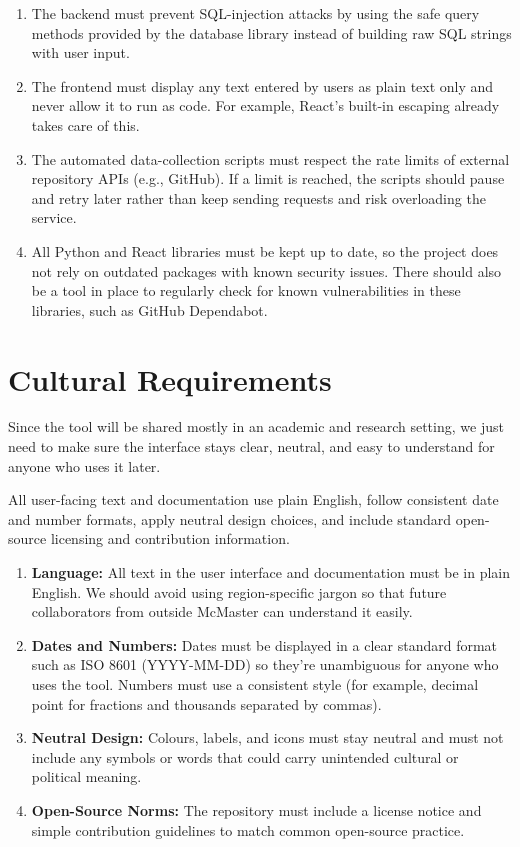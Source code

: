 \documentclass[12pt]{article}
\begin{document}
\begin{enumerate}[label=SR-IM\arabic*]
\item The backend must prevent SQL-injection attacks by using the safe query methods provided by the database library instead of building raw SQL strings with user input.
\item The frontend must display any text entered by users as plain text only and never allow it to run as code. For example, React’s built-in escaping already takes care of this.
\item The automated data-collection scripts must respect the rate limits of external repository APIs (e.g., GitHub). If a limit is reached, the scripts should pause and retry later rather than keep sending requests and risk overloading the service.
\item All Python and React libraries must be kept up to date, so the project does not rely on outdated packages with known security issues. There should also be a tool in place to regularly check for known vulnerabilities in these libraries, such as GitHub Dependabot.
\end{enumerate}

\section{Cultural Requirements}
Since the tool will be shared mostly in an academic and research setting, we just need to make sure the interface stays clear, neutral, and easy to understand for anyone who uses it later.

All user-facing text and documentation use plain English, follow consistent date and number formats, apply neutral design choices, and include standard open-source licensing and contribution information.
\begin{enumerate}[label=CU-CR\arabic*]
\item \textbf{Language:} All text in the user interface and documentation must be in plain English. We should avoid using region-specific jargon so that future collaborators from outside McMaster can understand it easily.
\item \textbf{Dates and Numbers:} Dates must be displayed in a clear standard format such as ISO 8601 (YYYY-MM-DD) so they’re unambiguous for anyone who uses the tool. Numbers must use a consistent style (for example, decimal point for fractions and thousands separated by commas).
\item \textbf{Neutral Design:} Colours, labels, and icons must stay neutral and must not include any symbols or words that could carry unintended cultural or political meaning.
\item \textbf{Open-Source Norms:} The repository must include a license notice and simple contribution guidelines to match common open-source practice.
\end{enumerate}
\end{document}
